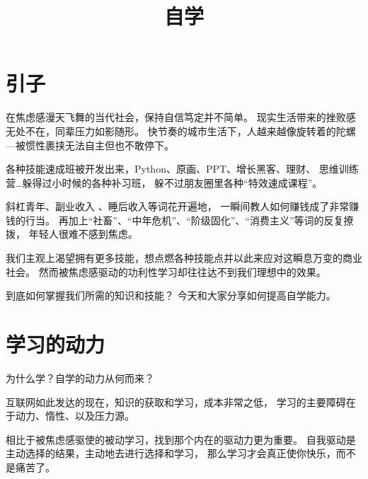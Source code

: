 \documentclass[../main.tex]{subfiles}
\title{自学}
\begin{document}
\maketitle
%
\section{引子}
在焦虑感漫天飞舞的当代社会，保持自信笃定并不简单。
现实生活带来的挫败感无处不在，同辈压力如影随形。
快节奏的城市生活下，人越来越像旋转着的陀螺
---被惯性裹挟无法自主但也不敢停下。

各种技能速成班被开发出来，Python、原画、PPT、增长黑客、理财、
思维训练营…躲得过小时候的各种补习班，
躲不过朋友圈里各种``特效速成课程''。

斜杠青年、副业收入 、睡后收入等词花开遍地，
一瞬间教人如何赚钱成了非常赚钱的行当。
再加上``社畜''、``中年危机''、``阶级固化''、``消费主义''等词的反复撩拨，
年轻人很难不感到焦虑。

我们主观上渴望拥有更多技能，想点燃各种技能点并以此来应对这瞬息万变的商业社会。
然而被焦虑感驱动的功利性学习却往往达不到我们理想中的效果。

到底如何掌握我们所需的知识和技能？
今天和大家分享如何提高自学能力。
%
\section{学习的动力}
为什么学？自学的动力从何而来？

互联网如此发达的现在，知识的获取和学习，成本非常之低，
学习的主要障碍在于动力、惰性、以及压力源。

相比于被焦虑感驱使的被动学习，找到那个内在的驱动力更为重要。
自我驱动是主动选择的结果，主动地去进行选择和学习，
那么学习才会真正使你快乐，而不是痛苦了。 \\
\end{document}
